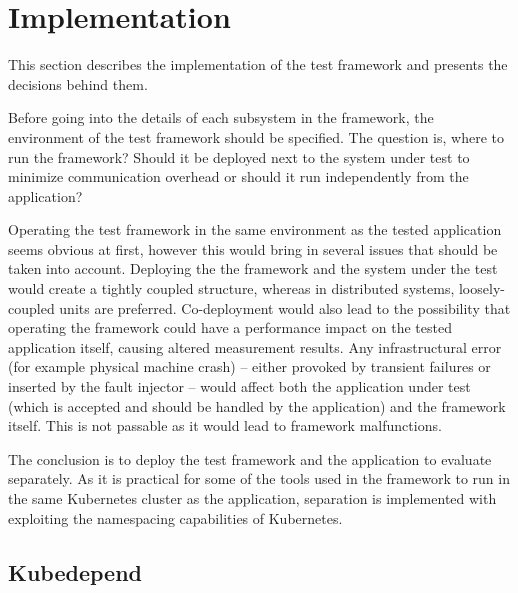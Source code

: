 \section{Implementation}


This section describes the implementation of the test framework and presents the decisions behind them.

Before going into the details of each subsystem in the framework, the environment of the test framework should be specified. The question is, where to run the framework? Should it be deployed next to the system under test to minimize communication overhead or should it run independently from the application?

Operating the test framework in the same environment as the tested application seems obvious at first, however this would bring in several issues that should be taken into account. Deploying the the framework and the system under the test would create a tightly coupled structure, whereas in distributed systems, loosely-coupled units are preferred. Co-deployment would also lead to the possibility that operating the framework could have a performance impact on the tested application itself, causing altered measurement results. Any infrastructural error (for example physical machine crash) -- either provoked by transient failures or inserted by the fault injector -- would affect both the application under test (which is accepted and should be handled by the application) and the framework itself. This is not passable as it would lead to framework malfunctions.

The conclusion is to deploy the test framework and the application to evaluate separately. As it is practical for some of the tools used in the framework to run in the same Kubernetes cluster as the application, separation is implemented with exploiting the namespacing capabilities of Kubernetes.

\subsection{Kubedepend}

